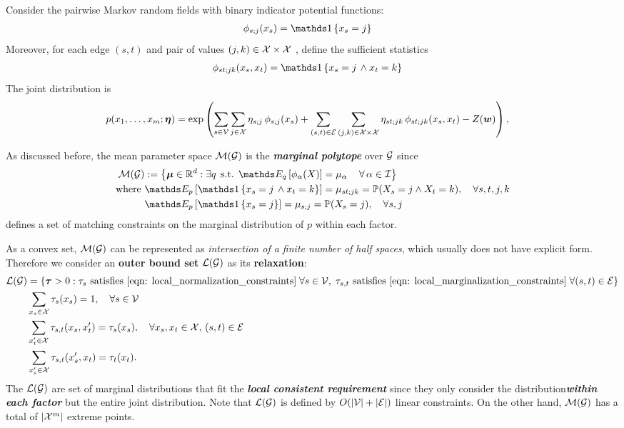 \documentclass[11pt]{article}
\begin{document}
Consider the pairwise Markov random fields with binary indicator potential functions: 
\begin{align}
\phi_{s;j}(x_s) &= \ind{x_s = j}  \label{eqn: metric_label_sufficient}
\end{align} 
Moreover, for each edge $(s,t)$ and pair of values $(j,k) \in {\mathcal X} \times {\mathcal X}$ , define the sufficient statistics
\begin{align}
\phi_{st;jk}(x_s, x_t) &= \ind{x_s = j \, \land x_{t} = k}  \label{eqn: metric_label_sufficient2}
\end{align}
The joint distribution is 
\begin{align}
p(x_1, \ldots, x_m; \boldsymbol{\eta}) &= \exp\left(\sum_{s\in {\mathcal V}}\sum_{j \in {\mathcal X}}\eta_{s;j}\,\phi_{s;j}(x_s)  + \sum_{(s,t) \in {\mathcal E}}\sum_{(j,k) \in {\mathcal X} \times {\mathcal X}}\eta_{st;jk}\,\phi_{st;jk}(x_s, x_t)  - Z(\boldsymbol{w})\right), \label{eqn: potts_model}
\end{align}

As discussed before, the mean parameter space ${\mathcal M}({\mathcal G})$ is the \emph{\textbf{marginal polytope}} over ${\mathcal G}$ since 
\begin{align*}
\cM(\cG) &:= \set{\mb{\mu} \in \bR^d: \exists q\,\; \text{s.t. } \E{q}{\phi_{\alpha}(X)} = \mu_{\alpha}\,\quad  \forall\, \alpha \in \cI} \\
\text{where }&\E{p}{ \ind{x_s = j \, \land x_{t} = k}} = \mu_{st;jk} = \bP(X_s = j \land X_t = k), \quad \forall s,t, j, k \\
&\E{p}{  \ind{x_s = j} } = \mu_{s;j} = \bP(X_s = j ),  \quad \forall s, j
\end{align*} defines a set of matching constraints on the marginal distribution of $p$ within each factor.  

As a convex set, ${\mathcal M}({\mathcal G})$ can be represented as \emph{intersection of a finite number of half spaces}, which usually does not have explicit form. Therefore we consider an \textbf{outer bound set} ${\mathcal L}({\mathcal G})$ as its \textbf{relaxation}:
\begin{align}
{\mathcal L}({\mathcal G}) &= \left\{\boldsymbol{\tau} > 0:  \tau_s \text{ satisfies \eqref{eqn: local_normalization_constraints}}\; \forall s\in {\mathcal V}, \; \tau_{s,t}\text{ satisfies \eqref{eqn: local_marginalization_constraints}}\; \forall (s,t) \in {\mathcal E}\right\} \label{eqn: dual_marginal_polytope}\\
&\sum_{x_s \in {\mathcal X}}\tau_{s}(x_s) = 1,  \quad \forall s \in {\mathcal V} \label{eqn: local_normalization_constraints}\\
&\sum_{x_t' \in {\mathcal X}}\tau_{s,t}(x_s, x_t') = \tau_{s}(x_s), \quad \forall x_s, x_t \in {\mathcal X}, \, (s,t) \in {\mathcal E}  \label{eqn: local_marginalization_constraints}\\
&\sum_{x_s' \in {\mathcal X}}\tau_{s,t}(x_s', x_t) = \tau_{t}(x_t). \nonumber
\end{align} The ${\mathcal L}({\mathcal G})$  are set of marginal distributions that fit the \textbf{\emph{local consistent requirement}} since they only consider the distribution\textbf{\emph{within each factor}} but the entire joint distribution.  Note that ${\mathcal L}({\mathcal G})$ is defined by $O(|{\mathcal V}| + |{\mathcal E}|)$ linear constraints. On the other hand, ${\mathcal M}({\mathcal G})$ has a total of $|{\mathcal X}^m|$ extreme points.
\end{document}
